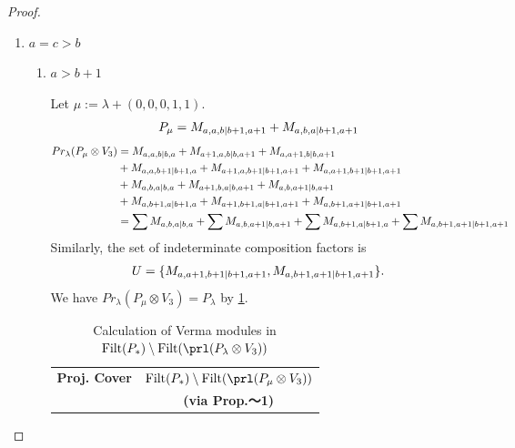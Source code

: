 \begin{proof}
\begin{enumerate}
  \item $a=c>b$
    \begin{enumerate}
      \item $a>b+1$ \par
        Let $\mu:=\lambda + (0,0,0,1,1) $.
        \begin{equation}\notag
          \begin{aligned}
            P_\mu = M_{a,a,b|b+1,a+1}
+ M_{a,b,a|b+1,a+1}
          \end{aligned}
        \end{equation}
        \begin{equation}\notag
          \begin{aligned}
            Pr_{\lambda}(P_\mu \otimes V_{3}) &=
M_{a,a,b|b,a}
+ M_{a+1,a,b|b,a+1}
+ M_{a,a+1,b|b,a+1}\\
                                            &
+ M_{a,a,b+1|b+1,a}
+ M_{a+1,a,b+1|b+1,a+1}
+ M_{a,a+1,b+1|b+1,a+1}\\
                                            &
+ M_{a,b,a|b,a}
+ M_{a+1,b,a|b,a+1}
+ M_{a,b,a+1|b,a+1}\\
                                            &
+ M_{a,b+1,a|b+1,a}
+ M_{a+1,b+1,a|b+1,a+1}
+ M_{a,b+1,a+1|b+1,a+1} \\
                                               &=
\sum M_{a,b,a|b,a}
+ \sum M_{a,b,a+1|b,a+1}
+ \sum M_{a,b+1,a|b+1,a}
+ \sum M_{a,b+1,a+1|b+1,a+1}
          \end{aligned}
        \end{equation}
      Similarly, the set of indeterminate composition factors is 
\begin{equation}\notag
  \begin{aligned}
    U = \{
M_{a,a+1,b+1|b+1,a+1},
M_{a,b+1,a+1|b+1,a+1}
\}.
  \end{aligned}
\end{equation}
       We have $Pr_{\lambda}(P_\mu \otimes V_{3}) = P_\lambda  $ by \cref{tab:verma-analysis_16}.
\begin{table}[htbp]
\centering
\caption{Calculation of Verma modules in $\operatorname{Filt}(P_*) \setminus \operatorname{Filt}(\prl(P_\lambda \otimes V_{3})) $ } \label{tab:verma-analysis_16}
\begin{tabular}{cc}
\toprule
\textbf{Proj. Cover} & \textbf{$\operatorname{Filt}(P_*) \setminus \operatorname{Filt}(\prl(P_\mu \otimes V_{3})) $}  \\
     & \textbf{(via Prop.～1)}  \\
\midrule

\end{tabular}
\end{table}
\end{enumerate}
\end{enumerate}
\end{proof}
